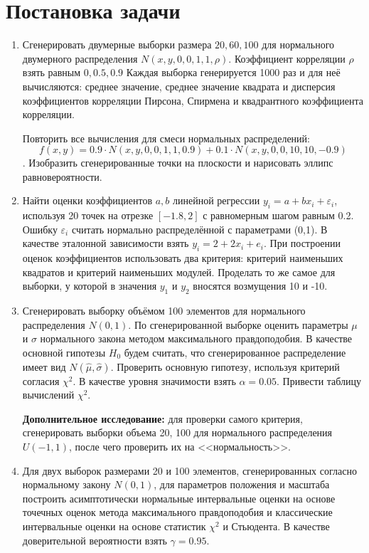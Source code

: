 \documentclass[12pt,a4paper]{article}
\begin{document}
\section{Постановка задачи}
\begin{enumerate}
	\item Сгенерировать двумерные выборки размера $20, 60, 100$ для нормального двумерного распределения $N(x, y, 0, 0, 1, 1, \rho)$.
	Коэффициент корреляции $\rho$ взять равным $0, 0.5, 0.9$
	Каждая выборка генерируется 1000 раз и для неё вычисляются: среднее значение, среднее значение квадрата и дисперсия коэффициентов
	корреляции Пирсона, Спирмена и квадрантного коэффициента корреляции.
	
	Повторить все вычисления для смеси нормальных распределений:
	$$f(x,y) = 0.9\cdot N(x, y, 0, 0, 1, 1, 0.9) + 0.1\cdot N(x, y, 0, 0, 10, 10, -0.9)$$.
	Изобразить сгенерированные точки на плоскости и нарисовать эллипс
	равновероятности.
	
	\item Найти оценки коэффициентов $a, b$ линейной регрессии $y_i = a + bx_i + \varepsilon_i$, используя 20 точек на отрезке $[-1.8, 2]$ с равномерным шагом равным 0.2. Ошибку $\varepsilon_i$ считать нормально распределённой с параметрами (0,1). В качестве эталонной зависимости взять $y_i = 2 + 2x_i + e_i$. При построении оценок коэффициентов использовать два критерия: критерий наименьших квадратов и критерий наименьших модулей. Проделать то же самое для выборки, у которой в значения $y_1$ и $y_2$ вносятся
	возмущения 10 и -10.
	
	\item Сгенерировать выборку объёмом 100 элементов для нормального распределения $N(0, 1)$. По сгенерированной выборке оценить параметры $\mu$ и $\sigma$ нормального закона методом максимального правдоподобия. В качестве основной гипотезы $H_0$ будем считать, что сгенерированное распределение имеет вид $N(\widehat{\mu}, \widehat{\sigma})$. Проверить основную гипотезу, используя критерий согласия $\chi^2$. В качестве уровня значимости взять $\alpha = 0.05$. Привести таблицу вычислений $\chi^2$. 
	
	\textbf{Дополнительное исследование:}\label{bonus} для проверки самого критерия, сгенерировать выборки объема 20, 100 для нормального распределения $U(-1, 1)$, после чего проверить их на <<нормальность>>.
	
	\item Для двух выборок размерами 20 и 100 элементов, сгенерированных согласно нормальному закону $N(0, 1)$, для параметров положения и масштаба построить асимптотически нормальные интервальные оценки на основе точечных оценок метода максимального правдоподобия и классические интервальные оценки на основе статистик $\chi^2$ и Стьюдента. В качестве доверительной вероятности взять $\gamma = 0.95$.
\end{enumerate}
\end{document}
